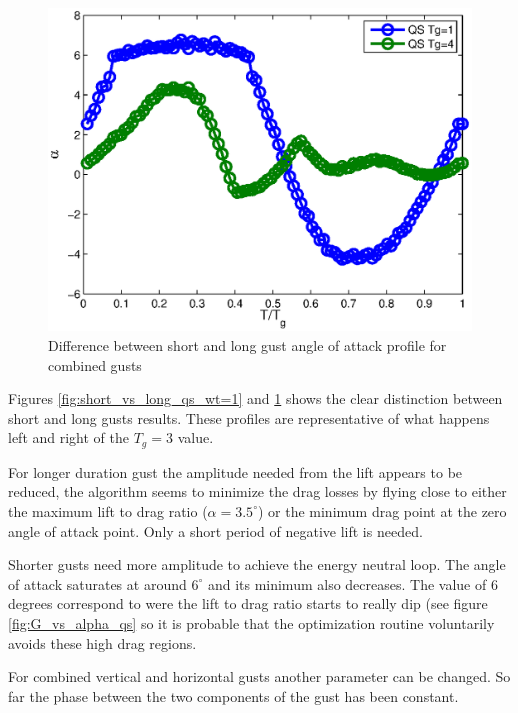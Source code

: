 \begin{figure}[h]
  \centering
  \includegraphics{./Figures/alpha_vs_Tg_QS_short_vs_long_wt3.eps}
  \caption{Difference between short and long gust angle of attack profile for combined gusts}
  \label{fig:short_vs_long_qs_wt=3}
\end{figure}

\par Figures \ref{fig:short_vs_long_qs_wt=1} and \ref{fig:short_vs_long_qs_wt=3} shows the clear distinction between short and long gusts results.
These profiles are representative of what happens left and right of the $T_g=3$ value.

\par For longer duration gust the amplitude needed from the lift appears to be reduced, the algorithm seems to minimize the drag losses by flying close to either the maximum lift to drag ratio ($\alpha = 3.5 ^{\circ}$) or the minimum drag point at the zero angle of attack point.
Only a short period of negative lift is needed.

\par Shorter gusts need more amplitude to achieve the energy neutral loop.
The angle of attack saturates at around $6^{\circ}$ and its minimum also decreases.
The value of 6 degrees correspond to were the lift to drag ratio starts to really dip (see figure \ref{fig:G_vs_alpha_qs} so it is probable that the optimization routine voluntarily avoids these high drag regions. 


\FloatBarrier
{}
For combined vertical and horizontal gusts another parameter can be changed.
So far the phase between the two components of the gust has been constant.

